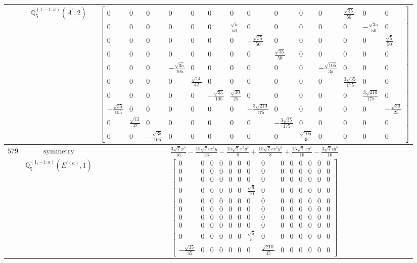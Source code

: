 \documentclass[fleqn,8pt,landscape]{jsarticle}
\begin{document}
\begin{longtable}{ccc}
$  $ & $ \mathbb{Q}_{5}^{(1,-1;a)}(A^{\prime},2) $ & $ \begin{bmatrix} 0 & 0 & 0 & 0 & 0 & 0 & 0 & 0 & 0 & 0 & 0 & \frac{\sqrt{35}}{50} & 0 & 0 \\ 0 & 0 & 0 & 0 & 0 & 0 & \frac{\sqrt{5}}{50} & 0 & 0 & 0 & 0 & 0 & - \frac{\sqrt{35}}{50} & 0 \\ 0 & 0 & 0 & 0 & 0 & 0 & 0 & - \frac{\sqrt{35}}{50} & 0 & 0 & 0 & 0 & 0 & \frac{\sqrt{5}}{50} \\ 0 & 0 & 0 & 0 & 0 & 0 & 0 & 0 & \frac{\sqrt{35}}{50} & 0 & 0 & 0 & 0 & 0 \\ 0 & 0 & 0 & - \frac{\sqrt{35}}{105} & 0 & 0 & 0 & 0 & 0 & 0 & - \frac{\sqrt{105}}{35} & 0 & 0 & 0 \\ 0 & 0 & 0 & 0 & \frac{\sqrt{14}}{42} & 0 & 0 & 0 & 0 & 0 & 0 & \frac{3 \sqrt{35}}{175} & 0 & 0 \\ 0 & 0 & 0 & 0 & 0 & - \frac{\sqrt{35}}{105} & \frac{\sqrt{30}}{25} & 0 & 0 & 0 & 0 & 0 & \frac{3 \sqrt{210}}{175} & 0 \\ - \frac{\sqrt{35}}{105} & 0 & 0 & 0 & 0 & 0 & 0 & - \frac{3 \sqrt{210}}{175} & 0 & 0 & 0 & 0 & 0 & - \frac{\sqrt{30}}{25} \\ 0 & \frac{\sqrt{14}}{42} & 0 & 0 & 0 & 0 & 0 & 0 & - \frac{3 \sqrt{35}}{175} & 0 & 0 & 0 & 0 & 0 \\ 0 & 0 & - \frac{\sqrt{35}}{105} & 0 & 0 & 0 & 0 & 0 & 0 & \frac{\sqrt{105}}{35} & 0 & 0 & 0 & 0 \end{bmatrix} $ \\ \hline
$ 579 $ & $ \text{symmetry} $ & $ \frac{3 \sqrt{7} x^{5}}{16} - \frac{15 \sqrt{7} i x^{4} y}{16} - \frac{15 \sqrt{7} x^{3} y^{2}}{8} + \frac{15 \sqrt{7} i x^{2} y^{3}}{8} + \frac{15 \sqrt{7} x y^{4}}{16} - \frac{3 \sqrt{7} i y^{5}}{16} $ \\
$  $ & $ \mathbb{Q}_{5}^{(1,-1;a)}(E^{\prime(a)},1) $ & $ \begin{bmatrix} 0 & 0 & 0 & 0 & 0 & 0 & 0 & 0 & 0 & 0 & 0 & 0 & 0 & 0 \\ 0 & 0 & 0 & 0 & 0 & 0 & 0 & 0 & 0 & 0 & 0 & 0 & 0 & 0 \\ 0 & 0 & 0 & 0 & 0 & 0 & 0 & 0 & 0 & 0 & 0 & 0 & 0 & 0 \\ 0 & 0 & 0 & 0 & 0 & 0 & \frac{\sqrt{6}}{10} & 0 & 0 & 0 & 0 & 0 & 0 & 0 \\ 0 & 0 & 0 & 0 & 0 & 0 & 0 & 0 & 0 & 0 & 0 & 0 & 0 & 0 \\ 0 & 0 & 0 & 0 & 0 & 0 & 0 & 0 & 0 & 0 & 0 & 0 & 0 & 0 \\ 0 & 0 & 0 & 0 & 0 & 0 & 0 & 0 & 0 & 0 & 0 & 0 & 0 & 0 \\ 0 & 0 & 0 & 0 & 0 & 0 & 0 & 0 & 0 & 0 & 0 & 0 & 0 & 0 \\ 0 & 0 & 0 & 0 & 0 & 0 & \frac{\sqrt{6}}{5} & 0 & 0 & 0 & 0 & 0 & 0 & 0 \\ - \frac{\sqrt{35}}{35} & 0 & 0 & 0 & 0 & 0 & 0 & \frac{\sqrt{210}}{35} & 0 & 0 & 0 & 0 & 0 & 0 \end{bmatrix} $ \\ \hline

\end{longtable}
\end{document}
